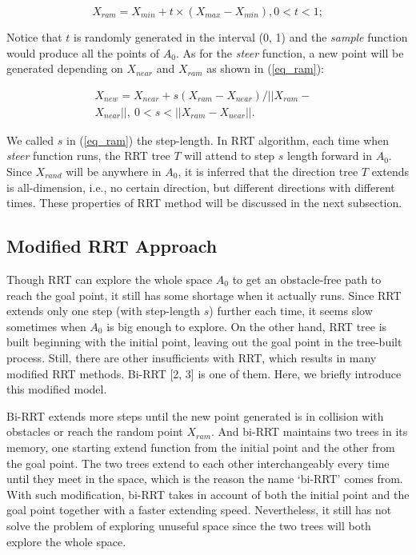 \documentclass[letterpaper, 10 pt, conference]{ieeeconf}  %
\begin{document}
 \begin{equation}
 X_{ram} = X_{min} + t \times (X_{max}-X_{min}), 0<t<1;
  \label{eq_sample}
 \end{equation}

Notice that $t$ is randomly generated in the interval (0, 1) and the \textit{sample} function would produce all the points of $A_{0}$. As for the \textit{steer} function, a new point will be generated depending on $X_{near}$ and $X_{ram}$ as shown in (\ref{eq_ram}):

\begin{equation} \label{eq_ram}
 \begin{array}{rr}
 X_{new} = X_{near} + s(X_{ram}-X_{near})/||X_{ram}-&\\
 X_{near}||,\ 0<s<||X_{ram}-X_{near}||.&
 \end{array}
 \end{equation}

 We called $s$ in (\ref{eq_ram}) the step-length. In RRT algorithm, each time when \textit{steer} function runs, the RRT tree $T$ will attend to step $s$ length forward in $A_{0}$. Since $X_{rand}$ will be anywhere in $A_{0}$, it is inferred that the direction tree $T$ extends is all-dimension, i.e., no certain direction, but different directions with different times. These properties of RRT method will be discussed in the next subsection.

\subsection{Modified RRT Approach}

Though RRT can explore the whole space $A_{0}$ to get an obstacle-free path to reach the goal point, it still has some shortage when it actually runs. Since RRT extends only one step (with step-length $s$) further each time, it seems slow sometimes when $A_{0}$ is big enough to explore. On the other hand, RRT tree is built beginning with the initial point, leaving out the goal point in the tree-built process. Still, there are other insufficients with RRT, which results in many modified RRT methods. Bi-RRT [2, 3] is one of them. Here, we briefly introduce this modified model.

Bi-RRT extends more steps until the new point generated  is in collision with obstacles or reach the random point $X_{ram}$. And bi-RRT maintains two trees in its memory, one starting extend function from the initial point and the other from the goal point. The two trees extend to each other interchangeably every time until they meet in the space, which is the reason the name `bi-RRT' comes from. With such modification, bi-RRT takes in account of both the initial point and the goal point together with a faster extending speed. Nevertheless, it still has not solve the problem of exploring unuseful space since the two trees will both explore the whole space.
\end{document}
